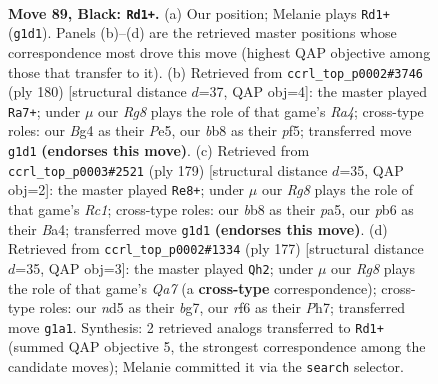\documentclass[11pt]{article}
\begin{document}
\clearpage

\begin{figure}[p]\centering
\begin{subfigure}{0.46\textwidth}\centering
\resizebox{\linewidth}{!}{%
\newchessgame
\chessboard[
  setfen={1B4k1/8/1P3R2/3N4/P3B1b1/3K3p/8/6r1 b - - 0 89},
  showmover=false,
  pgfstyle=straightmove, color=movearrow, markmove={g1-d1}
]}
\caption{}
\end{subfigure}\hfill
\begin{subfigure}{0.46\textwidth}\centering
\resizebox{\linewidth}{!}{%
\newchessgame
\chessboard[
  setfen={8/5k2/1B2b3/4Pp2/R4P1K/3r4/8/8 w - - 79 91},
  showmover=false,
  pgfstyle=straightmove, color=movearrow, markmove={a4-a7}
]}
\caption{}
\end{subfigure}
\\[4pt]
\begin{subfigure}{0.46\textwidth}\centering
\resizebox{\linewidth}{!}{%
\newchessgame
\chessboard[
  setfen={2r5/5k2/p7/P7/b3KP2/8/3B3R/8 b - - 2 90},
  showmover=false,
  pgfstyle=straightmove, color=movearrow, markmove={c8-e8}
]}
\caption{}
\end{subfigure}\hfill
\begin{subfigure}{0.46\textwidth}\centering
\resizebox{\linewidth}{!}{%
\newchessgame
\chessboard[
  setfen={8/3k2Bp/7P/8/2pN4/4RK2/q7/8 b - - 26 89},
  showmover=false,
  pgfstyle=straightmove, color=movearrow, markmove={a2-h2}
]}
\caption{}
\end{subfigure}
\caption{\textbf{Move 89, Black: \texttt{Rd1+}.} (a) Our position; Melanie plays \texttt{Rd1+} (\texttt{g1d1}). Panels (b)--(d) are the retrieved master positions whose correspondence most drove this move (highest QAP objective among those that transfer to it). (b) Retrieved from \texttt{ccrl\_top\_p0002\#3746} (ply 180) [structural distance $d$=37, QAP obj=4]: the master played \texttt{Ra7+}; under $\mu$ our \emph{Rg8} plays the role of that game's \emph{Ra4}; cross-type roles: our \emph{B}g4 as their \emph{P}e5, our \emph{b}b8 as their \emph{p}f5; transferred move \texttt{g1d1} \textbf{(endorses this move)}. (c) Retrieved from \texttt{ccrl\_top\_p0003\#2521} (ply 179) [structural distance $d$=35, QAP obj=2]: the master played \texttt{Re8+}; under $\mu$ our \emph{Rg8} plays the role of that game's \emph{Rc1}; cross-type roles: our \emph{b}b8 as their \emph{p}a5, our \emph{p}b6 as their \emph{B}a4; transferred move \texttt{g1d1} \textbf{(endorses this move)}. (d) Retrieved from \texttt{ccrl\_top\_p0002\#1334} (ply 177) [structural distance $d$=35, QAP obj=3]: the master played \texttt{Qh2}; under $\mu$ our \emph{Rg8} plays the role of that game's \emph{Qa7} (a \textbf{cross-type} correspondence); cross-type roles: our \emph{n}d5 as their \emph{b}g7, our \emph{r}f6 as their \emph{P}h7; transferred move \texttt{g1a1}. Synthesis: 2 retrieved analogs transferred to \texttt{Rd1+} (summed QAP objective 5, the strongest correspondence among the candidate moves); Melanie committed it via the \texttt{search} selector.}
\label{fig:thought-m177}
\end{figure}
\end{document}
